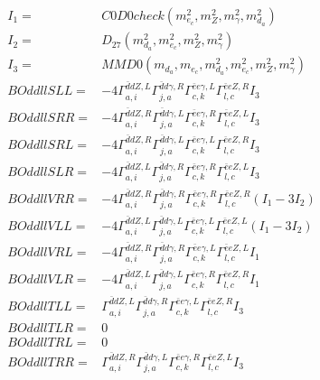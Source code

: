 \documentclass[A4,landscape]{article}
\begin{document}
\begin{align} 
I_1 = & C0D0check(m^2_{e_{{c}}}, m^2_{Z}, m^2_{\gamma}, m^2_{d_{{a}}}) \\ 
I_2 = & D_{27}(m^2_{d_{{a}}}, m^2_{e_{{c}}}, m^2_{Z}, m^2_{\gamma}) \\ 
I_3 = & MMD0(m_{d_{{a}}}, m_{e_{{c}}}, m^2_{d_{{a}}}, m^2_{e_{{c}}}, m^2_{Z}, m^2_{\gamma}) \\ 
  BOddllSLL= & -4  \Gamma^{\bar{d}d Z ,L}_{a, i} \Gamma^{\bar{d}d \gamma ,R}_{j, a} \Gamma^{\bar{e}e \gamma ,L}_{c, k} \Gamma^{\bar{e}e Z ,R}_{l, c} I_3 \\ 
  BOddllSRR= & -4  \Gamma^{\bar{d}d Z ,R}_{a, i} \Gamma^{\bar{d}d \gamma ,L}_{j, a} \Gamma^{\bar{e}e \gamma ,R}_{c, k} \Gamma^{\bar{e}e Z ,L}_{l, c} I_3 \\ 
  BOddllSRL= & -4  \Gamma^{\bar{d}d Z ,R}_{a, i} \Gamma^{\bar{d}d \gamma ,L}_{j, a} \Gamma^{\bar{e}e \gamma ,L}_{c, k} \Gamma^{\bar{e}e Z ,R}_{l, c} I_3 \\ 
  BOddllSLR= & -4  \Gamma^{\bar{d}d Z ,L}_{a, i} \Gamma^{\bar{d}d \gamma ,R}_{j, a} \Gamma^{\bar{e}e \gamma ,R}_{c, k} \Gamma^{\bar{e}e Z ,L}_{l, c} I_3 \\ 
  BOddllVRR= & -4  \Gamma^{\bar{d}d Z ,R}_{a, i} \Gamma^{\bar{d}d \gamma ,R}_{j, a} \Gamma^{\bar{e}e \gamma ,R}_{c, k} \Gamma^{\bar{e}e Z ,R}_{l, c} (I_1 - 3 I_2) \\ 
  BOddllVLL= & -4  \Gamma^{\bar{d}d Z ,L}_{a, i} \Gamma^{\bar{d}d \gamma ,L}_{j, a} \Gamma^{\bar{e}e \gamma ,L}_{c, k} \Gamma^{\bar{e}e Z ,L}_{l, c} (I_1 - 3 I_2) \\ 
  BOddllVRL= & -4  \Gamma^{\bar{d}d Z ,R}_{a, i} \Gamma^{\bar{d}d \gamma ,R}_{j, a} \Gamma^{\bar{e}e \gamma ,L}_{c, k} \Gamma^{\bar{e}e Z ,L}_{l, c} I_1 \\ 
  BOddllVLR= & -4  \Gamma^{\bar{d}d Z ,L}_{a, i} \Gamma^{\bar{d}d \gamma ,L}_{j, a} \Gamma^{\bar{e}e \gamma ,R}_{c, k} \Gamma^{\bar{e}e Z ,R}_{l, c} I_1 \\ 
  BOddllTLL= &  \Gamma^{\bar{d}d Z ,L}_{a, i} \Gamma^{\bar{d}d \gamma ,R}_{j, a} \Gamma^{\bar{e}e \gamma ,L}_{c, k} \Gamma^{\bar{e}e Z ,R}_{l, c} I_3 \\ 
  BOddllTLR= & 0 \\ 
  BOddllTRL= & 0 \\ 
  BOddllTRR= &  \Gamma^{\bar{d}d Z ,R}_{a, i} \Gamma^{\bar{d}d \gamma ,L}_{j, a} \Gamma^{\bar{e}e \gamma ,R}_{c, k} \Gamma^{\bar{e}e Z ,L}_{l, c} I_3 \\ 
\end{align} 
\end{document}
